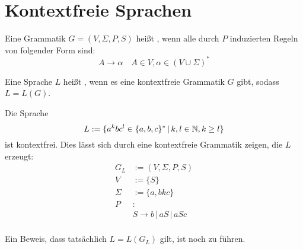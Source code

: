 \section{Kontextfreie Sprachen}

\begin{definition}
	Eine Grammatik $G = (V, \Sigma, P, S)$ heißt , wenn
	alle durch $P$ induzierten Regeln von folgender Form sind:
	\begin{equation}
		A \rightarrow \alpha \quad A \in V, \alpha \in (V \cup \Sigma)^*
	\end{equation}
\end{definition}

\begin{definition}
	Eine Sprache $L$ heißt , wenn es eine kontextfreie
	Grammatik $G$ gibt, sodass $L = L(G)$.
\end{definition}

\begin{example}
	Die Sprache
	\begin{equation}
		\label{thinf:cf:lang_1}
		L := \{a^kbc^l \in \{a,b,c\}^* \,|\, k,l \in \mathbb{N}, k \geq l \}
	\end{equation}
	ist kontextfrei. Dies lässt sich durch eine kontextfreie Grammatik
	zeigen, die $L$ erzeugt:
	\begin{align*}
		G_L & := (V,\Sigma,P,S) \\
		V & := \{S \} \\
		\Sigma & := \{a,bkc \} \\
		P & \colon \\
		       & S \rightarrow b \,|\, aS \,|\, aSc  \\
	\end{align*}

	Ein Beweis, dass tatsächlich $L = L(G_L)$ gilt, ist noch zu führen.
\end{example}

